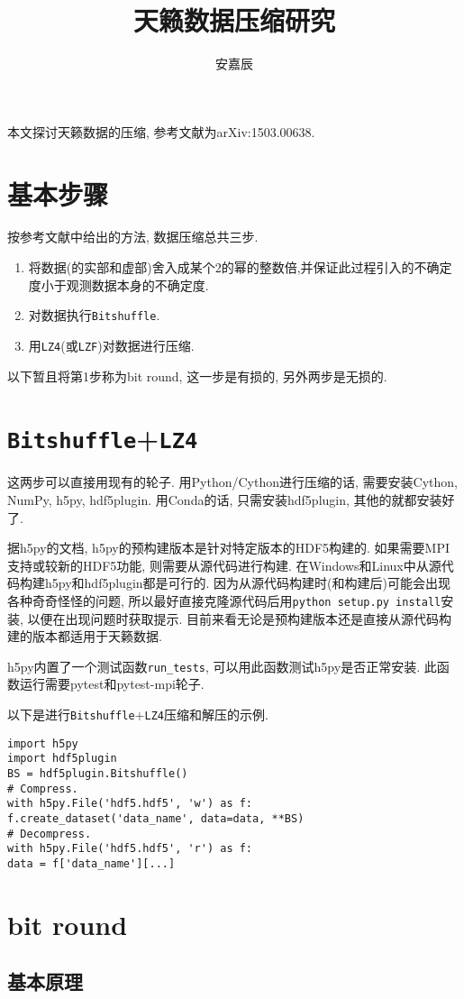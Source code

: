 \documentclass[12pt]{ctexart}
\title{天籁数据压缩研究}
\author{安嘉辰}
\def\v{\verb}
\begin{document}
\maketitle
本文探讨天籁数据的压缩, 参考文献为arXiv:1503.00638.
\tableofcontents
\section{基本步骤}
按参考文献中给出的方法, 数据压缩总共三步.
\begin{enumerate}
    \item 将数据(的实部和虚部)舍入成某个2的幂的整数倍,并保证此过程引入的不确定度小于观测数据本身的不确定度.
    \item 对数据执行\v|Bitshuffle|.
    \item 用\v|LZ4|(或\v|LZF|)对数据进行压缩.
\end{enumerate}
以下暂且将第1步称为bit round, 这一步是有损的, 另外两步是无损的.
\section{\texttt{Bitshuffle}+\texttt{LZ4}}
这两步可以直接用现有的轮子. 用Python/Cython进行压缩的话, 需要安装Cython, NumPy, h5py, hdf5plugin. 用Conda的话, 只需安装hdf5plugin, 其他的就都安装好了.

据h5py的文档, h5py的预构建版本是针对特定版本的HDF5构建的. 如果需要MPI支持或较新的HDF5功能, 则需要从源代码进行构建. 在Windows和Linux中从源代码构建h5py和hdf5plugin都是可行的. 因为从源代码构建时(和构建后)可能会出现各种奇奇怪怪的问题, 所以最好直接克隆源代码后用\v|python setup.py install|安装, 以便在出现问题时获取提示. 目前来看无论是预构建版本还是直接从源代码构建的版本都适用于天籁数据.

h5py内置了一个测试函数\v|run_tests|, 可以用此函数测试h5py是否正常安装. 此函数运行需要pytest和pytest-mpi轮子.

以下是进行\v|Bitshuffle|+\v|LZ4|压缩和解压的示例.
\begin{verbatim}
import h5py
import hdf5plugin
BS = hdf5plugin.Bitshuffle()
# Compress.
with h5py.File('hdf5.hdf5', 'w') as f:
f.create_dataset('data_name', data=data, **BS)
# Decompress.
with h5py.File('hdf5.hdf5', 'r') as f:
data = f['data_name'][...]
\end{verbatim}

\section{bit round}

\subsection{基本原理}
\end{document}
